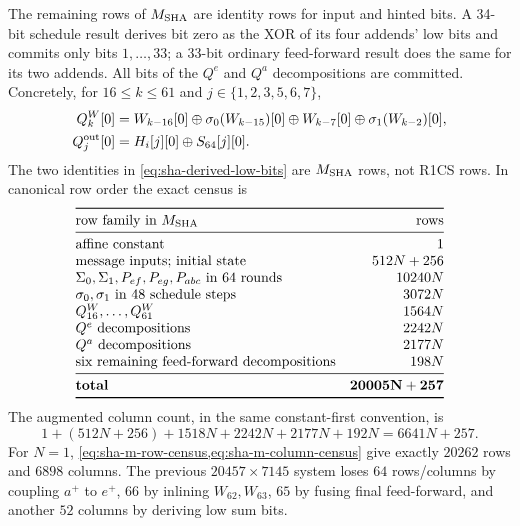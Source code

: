 The remaining rows of $M_{\rm SHA}$ are identity rows for input and hinted
bits.  A 34-bit schedule result derives bit zero as the XOR of its four
addends' low bits and commits only bits $1,\ldots,33$; a 33-bit ordinary
feed-forward result does the same for its two addends.  All bits of the
$Q^e$ and $Q^a$ decompositions are committed.  Concretely, for
$16\le k\le61$ and $j\in\{1,2,3,5,6,7\}$,
\begin{equation}
 \begin{aligned}
 Q^W_k[0]&=W_{k-16}[0]\oplus\sigma_0(W_{k-15})[0]
              \oplus W_{k-7}[0]\oplus\sigma_1(W_{k-2})[0],\\
 Q^{\rm out}_j[0]&=H_i[j][0]\oplus S_{64}[j][0].
 \end{aligned}
 \label{eq:sha-derived-low-bits}
\end{equation}
The two identities in \cref{eq:sha-derived-low-bits} are $M_{\rm SHA}$ rows,
not R1CS rows.  In canonical row order the exact census is
\begin{equation}
\begin{array}{@{}lr@{}}
\toprule
\text{row family in }M_{\rm SHA} & \text{rows}\\
\midrule
\text{affine constant} & 1\\
\text{message inputs; initial state} & 512N+256\\
\Sigma_0,\Sigma_1,P_{ef},P_{eg},P_{abc}\text{ in 64 rounds} & 10240N\\
\sigma_0,\sigma_1\text{ in 48 schedule steps} & 3072N\\
Q^W_{16},\ldots,Q^W_{61} & 1564N\\
Q^e\text{ decompositions} & 2242N\\
Q^a\text{ decompositions} & 2177N\\
\text{six remaining feed-forward decompositions} & 198N\\
\midrule
\textbf{total} & \mathbf{20005N+257}
\\\bottomrule
\end{array}
 \label{eq:sha-m-row-census}
\end{equation}
The augmented column count, in the same constant-first convention, is
\begin{equation}
 1+(512N+256)+1518N+2242N+2177N+192N
   =6641N+257.
 \label{eq:sha-m-column-census}
\end{equation}
For $N=1$, \cref{eq:sha-m-row-census,eq:sha-m-column-census} give exactly
$20262$ rows and $6898$ columns.  The previous $20457\times7145$ system loses
$64$ rows/columns by coupling $a^+$ to $e^+$, $66$ by inlining $W_{62},W_{63}$,
$65$ by fusing final feed-forward, and another $52$ columns by deriving low
sum bits.

